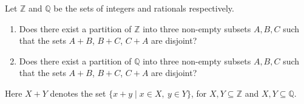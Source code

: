 Let $\mathbb{Z}$ and $\mathbb{Q}$ be the sets of integers and rationals respectively.

\begin{enumerate}
\item[a)] Does there exist a partition of $\mathbb{Z}$ into three non-empty subsets $A, B, C$ such that the sets $A+B$, $B+C$, $C+A$ are disjoint?
\item[b)] Does there exist a partition of $\mathbb{Q}$ into three non-empty subsets $A, B, C$ such that the sets $A+B$, $B+C$, $C+A$ are disjoint?
\end{enumerate}

Here $X+Y$ denotes the set $\{x+y \mid x \in X,\ y \in Y\}$, for $X, Y \subseteq \mathbb{Z}$ and $X, Y \subseteq \mathbb{Q}$.
